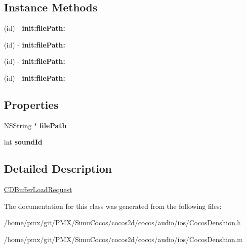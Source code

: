 \subsection*{Instance Methods}
\begin{DoxyCompactItemize}
\item 
\mbox{\label{interfaceCDBufferLoadRequest_ae89a0e1a09d175c49ad24d1559415eef}} 
(id) -\/ {\bfseries init\+:file\+Path\+:}
\item 
\mbox{\label{interfaceCDBufferLoadRequest_ae89a0e1a09d175c49ad24d1559415eef}} 
(id) -\/ {\bfseries init\+:file\+Path\+:}
\item 
\mbox{\label{interfaceCDBufferLoadRequest_ae89a0e1a09d175c49ad24d1559415eef}} 
(id) -\/ {\bfseries init\+:file\+Path\+:}
\item 
\mbox{\label{interfaceCDBufferLoadRequest_ae89a0e1a09d175c49ad24d1559415eef}} 
(id) -\/ {\bfseries init\+:file\+Path\+:}
\end{DoxyCompactItemize}
\subsection*{Properties}
\begin{DoxyCompactItemize}
\item 
\mbox{\label{interfaceCDBufferLoadRequest_ab90e9336fb63689b75041483bfed6fca}} 
N\+S\+String $\ast$ {\bfseries file\+Path}
\item 
\mbox{\label{interfaceCDBufferLoadRequest_ac62e4c90f466471a1b378dd7034e5d7d}} 
int {\bfseries sound\+Id}
\end{DoxyCompactItemize}


\subsection{Detailed Description}
\hyperlink{interfaceCDBufferLoadRequest}{C\+D\+Buffer\+Load\+Request} 

The documentation for this class was generated from the following files\+:\begin{DoxyCompactItemize}
\item 
/home/pmx/git/\+P\+M\+X/\+Simu\+Cocos/cocos2d/cocos/audio/ios/\hyperlink{cocos2d_2cocos_2audio_2ios_2CocosDenshion_8h}{Cocos\+Denshion.\+h}\item 
/home/pmx/git/\+P\+M\+X/\+Simu\+Cocos/cocos2d/cocos/audio/ios/Cocos\+Denshion.\+m\end{DoxyCompactItemize}
